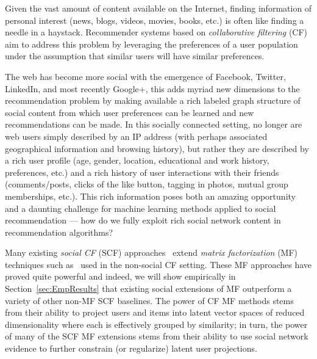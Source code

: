 Given the vast amount of content available on the Internet, finding
information of personal interest (news, blogs, videos, movies, books,
etc.) is often like finding a needle in a haystack.  Recommender
systems based on \emph{collaborative filtering}
(CF)~\cite{collab_filtering} aim to address this problem by leveraging
the preferences of a user population under the assumption that similar
users will have similar preferences.

The web has become more social with the emergence of Facebook,
Twitter, LinkedIn, and most recently Google+, this adds myriad new
dimensions to the recommendation problem by making available a rich
labeled graph structure of social content from which user preferences
can be learned and new recommendations can be made.  In this socially
connected setting, no longer are web users simply described by an IP
address (with perhaps associated geographical information and browsing
history), but rather they are described by a rich user profile (age,
gender, location, educational and work history, preferences, etc.)
and a rich history of user interactions with their friends (comments/posts, 
clicks of the like button, tagging in photos, mutual group
memberships, etc.).  This rich information poses both an amazing
opportunity and a daunting challenge for machine learning methods
applied to social recommendation --- how do we fully exploit rich social
network content in recommendation algorithms?

Many existing \emph{social CF} (SCF)
approaches~\cite{ste,sorec,lla,socinf,sr,rrmf} extend \emph{matrix
factorization} (MF) techniques such as~\cite{pmf} used in the
non-social CF setting.  These MF approaches have proved quite powerful
and indeed, we will show empirically in Section~\ref{sec:EmpResults} 
that existing social extensions of MF outperform a variety of other
non-MF SCF baselines.  The power of CF MF methods stems from their
ability to project users and items into latent vector spaces of
reduced dimensionality where each is effectively grouped by
similarity; in turn, the power of many of the SCF MF extensions stems
from their ability to use social network evidence to further constrain
(or regularize) latent user projections.

